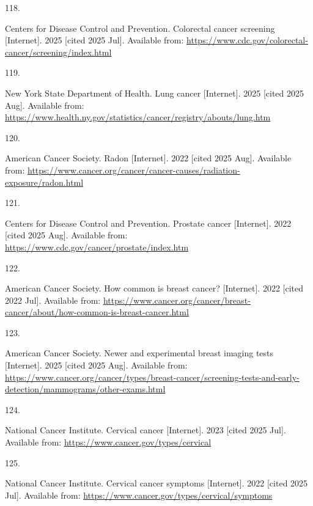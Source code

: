 \documentclass[
  english,
  letterpaper,
]{report}
\newlength{\cslhangindent}
\newlength{\csllabelwidth}
\newenvironment{CSLReferences}[2] %
 {\begin{list}{}{%
  \setlength{\itemindent}{0pt}
  \setlength{\leftmargin}{0pt}
  \setlength{\parsep}{0pt}
  \ifodd #1
   \setlength{\leftmargin}{\cslhangindent}
   \setlength{\itemindent}{-1\cslhangindent}
  \fi
  \setlength{\itemsep}{#2\baselineskip}}}
 {\end{list}}
\newcommand{\CSLLeftMargin}[1]{\parbox[t]{\csllabelwidth}{\strut#1\strut}}
\newcommand{\CSLRightInline}[1]{\parbox[t]{\linewidth - \csllabelwidth}{\strut#1\strut}}
\begin{document}
\begin{CSLReferences}{0}{1}
\CSLLeftMargin{118. }%
\CSLRightInline{Centers for Disease Control and Prevention. Colorectal
cancer screening {[}Internet{]}. 2025 {[}cited 2025 Jul{]}. Available
from: \url{https://www.cdc.gov/colorectal-cancer/screening/index.html}}

\CSLLeftMargin{119. }%
\CSLRightInline{New York State Department of Health. Lung cancer
{[}Internet{]}. 2025 {[}cited 2025 Aug{]}. Available from:
\url{https://www.health.ny.gov/statistics/cancer/registry/abouts/lung.htm}}

\CSLLeftMargin{120. }%
\CSLRightInline{American Cancer Society. Radon {[}Internet{]}. 2022
{[}cited 2025 Aug{]}. Available from:
\url{https://www.cancer.org/cancer/cancer-causes/radiation-exposure/radon.html}}

\CSLLeftMargin{121. }%
\CSLRightInline{Centers for Disease Control and Prevention. Prostate
cancer {[}Internet{]}. 2022 {[}cited 2025 Aug{]}. Available from:
\url{https://www.cdc.gov/cancer/prostate/index.htm}}

\CSLLeftMargin{122. }%
\CSLRightInline{American Cancer Society. How common is breast cancer?
{[}Internet{]}. 2022 {[}cited 2022 Jul{]}. Available from:
\url{https://www.cancer.org/cancer/breast-cancer/about/how-common-is-breast-cancer.html}}

\CSLLeftMargin{123. }%
\CSLRightInline{American Cancer Society. Newer and experimental breast
imaging tests {[}Internet{]}. 2025 {[}cited 2025 Aug{]}. Available from:
\url{https://www.cancer.org/cancer/types/breast-cancer/screening-tests-and-early-detection/mammograms/other-exams.html}}

\CSLLeftMargin{124. }%
\CSLRightInline{National Cancer Institute. Cervical cancer
{[}Internet{]}. 2023 {[}cited 2025 Jul{]}. Available from:
\url{https://www.cancer.gov/types/cervical}}

\CSLLeftMargin{125. }%
\CSLRightInline{National Cancer Institute. Cervical cancer symptoms
{[}Internet{]}. 2022 {[}cited 2025 Jul{]}. Available from:
\url{https://www.cancer.gov/types/cervical/symptoms}}


\end{CSLReferences}
\end{document}
